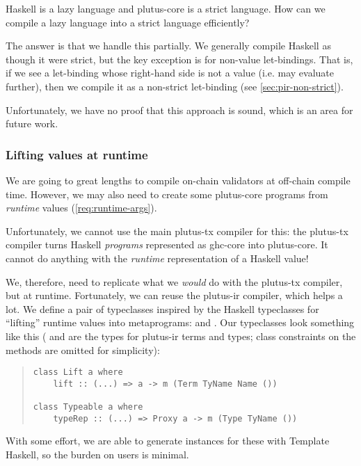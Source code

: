 Haskell is a lazy language and \gls{plutus-core} is a strict language.
How can we compile a lazy language into a strict language efficiently?

The answer is that we handle this partially.
We generally compile Haskell as though it were strict, but the key exception is for non-value let-bindings.
That is, if we see a let-binding whose right-hand side is not a value (i.e. may evaluate further), then we compile it as a non-strict let-binding (see \cref{sec:pir-non-strict}).

Unfortunately, we have no proof that this approach is sound, which is an area for future work.

\subsubsection{Lifting values at runtime}
\label{sec:plutus-tx-lifting}

We are going to great lengths to compile \gls{on-chain} \glspl{validator} at \gls{off-chain} compile time.
However, we may also need to create some \gls{plutus-core} programs from \emph{runtime} values (\cref{req:runtime-args}).

Unfortunately, we cannot use the main \gls{plutus-tx} compiler for this: the \gls{plutus-tx} compiler turns Haskell \emph{programs} represented as \gls{ghc-core} into \gls{plutus-core}.
It cannot do anything with the \emph{runtime} representation of a Haskell value!

We, therefore, need to replicate what we \emph{would} do with the \gls{plutus-tx} compiler, but at runtime.
Fortunately, we can reuse the \gls{plutus-ir} compiler, which helps a lot.
We define a pair of typeclasses inspired by the Haskell typeclasses for ``lifting'' runtime values into metaprograms:  and .
Our typeclasses look something like this ( and  are the types for \gls{plutus-ir} terms and types; class constraints on the methods are omitted for simplicity):

\begin{quote}
\begin{verbatim}
class Lift a where
    lift :: (...) => a -> m (Term TyName Name ())

class Typeable a where
    typeRep :: (...) => Proxy a -> m (Type TyName ())
\end{verbatim}
\end{quote}

With some effort, we are able to generate instances for these with Template Haskell, so the burden on users is minimal.

